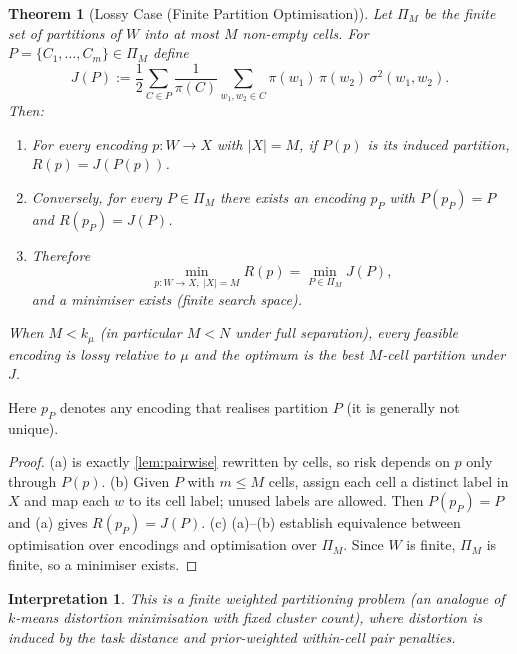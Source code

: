 \documentclass[12pt]{article}
\newtheorem{theorem}{Theorem}[section]
\newtheorem*{interpretation}{Interpretation}
\newcommand{\kmu}{k_\mu}
\newcommand{\sigmasq}{\sigma^2}
\begin{document}
\begin{theorem}[Lossy Case (Finite Partition Optimisation)]\label{thm:lossy}
Let $\Pi_M$ be the finite set of partitions of $W$ into at most $M$ non-empty cells. For $P = \{C_1, \ldots, C_m\} \in \Pi_M$ define
\begin{equation}\label{eq:lossy-objective}
J(P) := \frac{1}{2} \sum_{C \in P} \frac{1}{\pi(C)} \sum_{w_1, w_2 \in C} \pi(w_1)\,\pi(w_2)\,\sigmasq(w_1, w_2).
\end{equation}
Then:
\begin{enumerate}[label=(\alph*)]
\item For every encoding $p\colon W \to X$ with $|X| = M$, if $P(p)$ is its induced partition, $R(p) = J(P(p))$.
\item Conversely, for every $P \in \Pi_M$ there exists an encoding $p_P$ with $P(p_P) = P$ and $R(p_P) = J(P)$.
\item Therefore
\begin{equation}
\min_{p\colon W \to X,\; |X|=M} R(p) = \min_{P \in \Pi_M} J(P),
\end{equation}
and a minimiser exists (finite search space).
\end{enumerate}
When $M < \kmu$ (in particular $M < N$ under full separation), every feasible encoding is lossy relative to $\mu$ and the optimum is the best $M$-cell partition under $J$.
\end{theorem}

Here $p_P$ denotes any encoding that realises partition $P$ (it is generally not unique).

\begin{proof}
(a) is exactly \cref{lem:pairwise} rewritten by cells, so risk depends on $p$ only through $P(p)$. (b) Given $P$ with $m \le M$ cells, assign each cell a distinct label in $X$ and map each $w$ to its cell label; unused labels are allowed. Then $P(p_P) = P$ and (a) gives $R(p_P) = J(P)$. (c) (a)--(b) establish equivalence between optimisation over encodings and optimisation over $\Pi_M$. Since $W$ is finite, $\Pi_M$ is finite, so a minimiser exists.
\end{proof}

\begin{interpretation}
This is a finite weighted partitioning problem (an analogue of $k$-means distortion minimisation with fixed cluster count), where distortion is induced by the task distance and prior-weighted within-cell pair penalties.
\end{interpretation}
\end{document}
